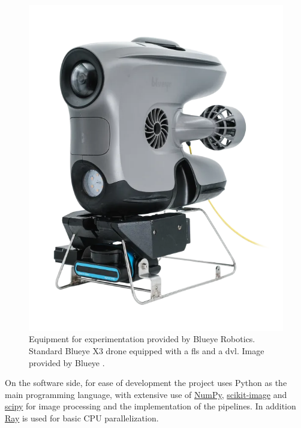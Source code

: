 \begin{figure}[H]
  \centering
  \includegraphics[width=.5\textwidth]{figures/blueye_x3.png}
  \caption[Blueye Robotics X3 \acrshort{rov} equipped with \acrshort{bsosonar}]{Equipment for experimentation provided by Blueye Robotics. Standard Blueye X3 drone equipped with a \acrshort{fls} and a \acrshort{dvl}. Image provided by Blueye \cite{Blueye:X3}.}
  \label{fig:sonarapp}
\end{figure}

On the software side, for ease of development the project uses Python as the main programming language, with extensive use of \href{https://numpy.org}{NumPy}, \href{https://scikit-image.org}{scikit-image} and \href{https://scipy.org}{scipy} for image processing and the implementation of the pipelines. In addition \href{https://www.ray.io}{Ray} is used for basic CPU parallelization. 

